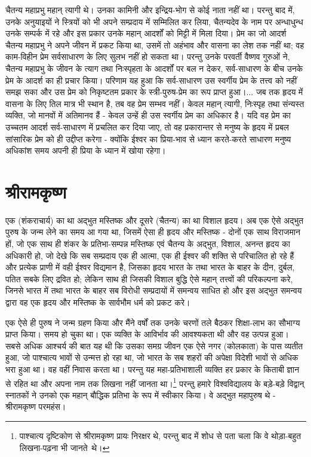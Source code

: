 चैतन्य महाप्रभु महान् त्यागी थे। उनका कामिनी और इन्द्रिय-भोग से कोई नाता नहीं था। परन्तु बाद में, उनके अनुयाइयों ने स्त्रियों को भी अपने सम्प्रदाय में सम्मिलित कर लिया, चैतन्यदेव के नाम पर अन्धाधुन्ध उनके सम्पर्क में रहे और इस प्रकार उनके महान् आदर्शों को मिट्टी में मिला दिया। प्रेम का जो आदर्श चैतन्य महाप्रभु ने अपने जीवन में प्रकट किया था, उसमें तो अहंभाव और वासना का लेश तक नहीं था; वह काम-विहीन प्रेम सर्वसाधारण के लिए सुलभ नहीं हो सकता था। परन्तु उनके परवर्ती वैष्णव गुरुओं ने, चैतन्य महाप्रभु के जीवन के त्याग तथा निःस्पृहता के आदर्शों पर बल न देकर, सर्व-साधारण के बीच उनके प्रेम के आदर्श का ही प्रचार किया। परिणाम यह हुआ कि सर्व-साधारण उस स्वर्गीय प्रेम के तत्त्व को नहीं समझ सका और उस प्रेम को निकृष्टतम प्रकार के स्त्री-पुरुष-प्रेम का रूप प्राप्त हुआ।... जब तक हृदय में वासना के लिए तिल मात्र भी स्थान है, तब वह प्रेम सम्भव नहीं। केवल महान् त्यागी, निःस्पृह तथा संन्यस्त व्यक्ति, जो मानवों में अतिमानव हैं - केवल उन्हें ही उस स्वर्गीय प्रेम का अधिकार है। यदि वह प्रेम का उच्चतम आदर्श सर्व-साधारण में प्रचलित कर दिया जाए, तो वह प्रकारान्तर से मनुष्य के हृदय में प्रबल सांसारिक प्रेम को ही उद्दीप्त करेगा - क्योंकि ईश्वर का प्रिया-भाव से ध्यान करते-करते साधारण मनुष्य अधिकांश समय अपनी ही प्रिया के ध्यान में खोया रहेगा।


\section*{श्रीरामकृष्ण}


एक (शंकराचार्य) का था अद्भुत मस्तिष्क और दूसरे (चैतन्य) का था विशाल हृदय। अब एक ऐसे अद्भुत पुरुष के जन्म लेने का समय आ गया था, जिसमें ऐसा ही हृदय और मस्तिष्क - दोनों एक साथ विराजमान हों, जो एक साथ ही शंकर के प्रतिभा-सम्पन्न मस्तिष्क एवं चैतन्य के अद्भुत, विशाल, अनन्त हृदय का अधिकारी हो, जो देखे कि सब सम्प्रदाय एक ही आत्मा, एक ही ईश्वर की शक्ति से परिचालित हो रहे हैं और प्रत्येक प्राणी में वही ईश्वर विद्यमान है, जिसका हृदय भारत के तथा भारत के बाहर के दीन, दुर्बल, पतित सबके लिए द्रवित हो; लेकिन साथ ही जिसकी विशाल बुद्धि ऐसे महान् तत्त्वों की परिकल्पना करे, जिनसे भारत में तथा भारत के बाहर सब विरोधी सम्प्रदायों में समन्वय साधित हो और इस अद्भुत समन्वय द्वारा वह एक हृदय और मस्तिष्क के सार्वभौम धर्म को प्रकट करे। 

एक ऐसे ही पुरुष ने जन्म ग्रहण किया और मैंने वर्षों तक उनके चरणों तले बैठकर शिक्षा-लाभ का सौभाग्य प्राप्त किया। समय हो चुका था। एक व्यक्ति के आविर्भाव की आवश्यकता थी और वह उत्पन्न हुआ। सबसे अधिक आश्चर्य की बात यह थी कि उसका समग्र जीवन एक ऐसे नगर (कोलकाता) के पास व्यतीत हुआ, जो पाश्चात्य भावों से उन्मत्त हो रहा था, जो भारत के सब शहरों की अपेक्षा विदेशी भावों से अधिक भरा हुआ था। वह वहीं निवास करता था। परन्तु यह महा-प्रतिभाशाली व्यक्ति हर प्रकार के किताबी ज्ञान से रहित था और अपना नाम तक लिखना नहीं जानता था।\footnote{ पाश्चात्य दृष्टिकोण से श्रीरामकृष्ण प्रायः निरक्षर थे, परन्तु बाद में शोध से पता चला कि वे थोड़ा-बहुत लिखना-पढ़ना भी जानते~थे।} परन्तु हमारे विश्वविद्यालय के बड़े-बड़े विद्वान् स्नातकों ने उनको एक महान् बौद्धिक प्रतिभा के रूप में स्वीकार किया। वे अद्भुत महापुरुष थे - श्रीरामकृष्ण परमहंस। 

